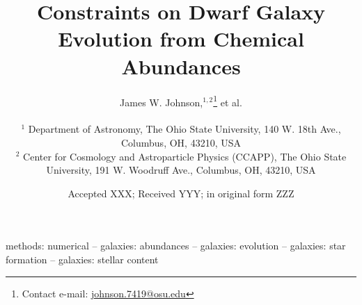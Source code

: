 \documentclass[fleqn, usenatbib]{mnras}
\title[Dwarf Galaxies and Chemical Abundances]{Constraints on Dwarf Galaxy
Evolution from Chemical Abundances}
\author[J.W. Johnson et al.]{James W. Johnson,$^{1, 2}$\thanks{
	Contact e-mail: \href{mailto:
	johnson.7419@osu.edu}{johnson.7419@osu.edu}} et al.
	\\ \null \\
	$^{1}$ Department of Astronomy, The Ohio State University,
	140 W. 18th Ave., Columbus, OH, 43210, USA
	\\
	$^{2}$ Center for Cosmology and Astroparticle Physics (CCAPP),
	The Ohio State University, 191 W. Woodruff Ave., Columbus, OH, 43210, USA
}
\date{Accepted XXX; Received YYY; in original form ZZZ}
\begin{document}
\label{firstpage}
\pagerange{\pageref{firstpage}--\pageref{lastpage}}
\maketitle



\begin{keywords}
methods: numerical -- galaxies: abundances -- galaxies: evolution --
galaxies: star formation -- galaxies: stellar content
\end{keywords}









\begin{appendices}


\end{appendices}

\label{lastpage}
\end{document}
